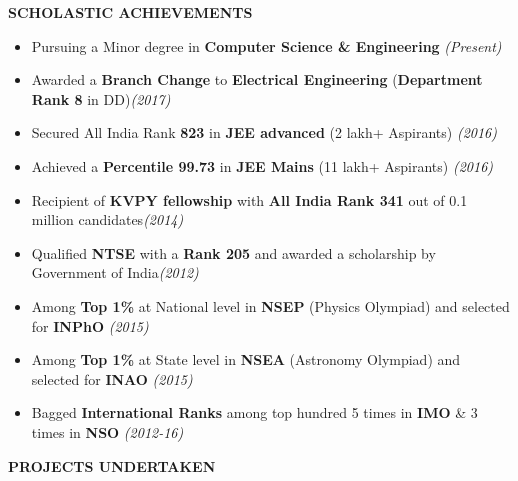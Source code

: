 \documentclass[11pt]{article}%
\begin{document}
\vspace*{3.5cm}

\begin{flushleft}
\bf{\bf{\LARGE{S}\Large{CHOLASTIC} \LARGE{A}\Large{CHIEVEMENTS}}}
\end{flushleft}
\vspace{-2mm}
\hline

\begin{itemize}
\setlength\itemsep{0.01em}

\item Pursuing a Minor degree in \textbf{Computer Science \& Engineering} \hfill {{{\em {(Present)}}}}
\item Awarded a \textbf{Branch Change} to \textbf{Electrical Engineering} (\textbf{Department Rank 8} in DD)\hfill {{{\em {(2017)}}}}

\item Secured All India Rank \textbf{823} in \textbf{JEE advanced} (2 lakh+ Aspirants) \hfill {{{\em {(2016)}}}}
\item Achieved a \textbf{Percentile 99.73} in \textbf{JEE Mains} (11 lakh+ Aspirants) \hfill {{{\em {(2016)}}}}
\item Recipient of \textbf{KVPY fellowship} with \textbf{All India Rank 341} out of 0.1 million candidates\hfill {{{\em {(2014)}}}}
\item Qualified \textbf{NTSE} with a \textbf{Rank 205} and awarded a scholarship by Government of India\hfill {{{\em {(2012)}}}}
\item Among \textbf{Top 1\%} at National level in \textbf{NSEP} (Physics Olympiad) and selected for \textbf{INPhO} \hfill {{{\em {(2015)}}}}
\item Among \textbf{Top 1\%} at State level in \textbf{NSEA} (Astronomy Olympiad) and selected for \textbf{INAO} \hfill {{{\em {(2015)}}}}
\item \nohyphens{Bagged \textbf{International Ranks} among top hundred 5 times in \textbf{IMO} \& 3 times in \textbf{NSO} \hfill {{{\em {(2012-16)}}}}}


\end{itemize}


















\begin{flushleft}
\bf{\LARGE{P}\Large{ROJECTS} \LARGE{U}\Large{NDERTAKEN}}
\end{flushleft}
\vspace{-2mm}
\hline
\end{document}
